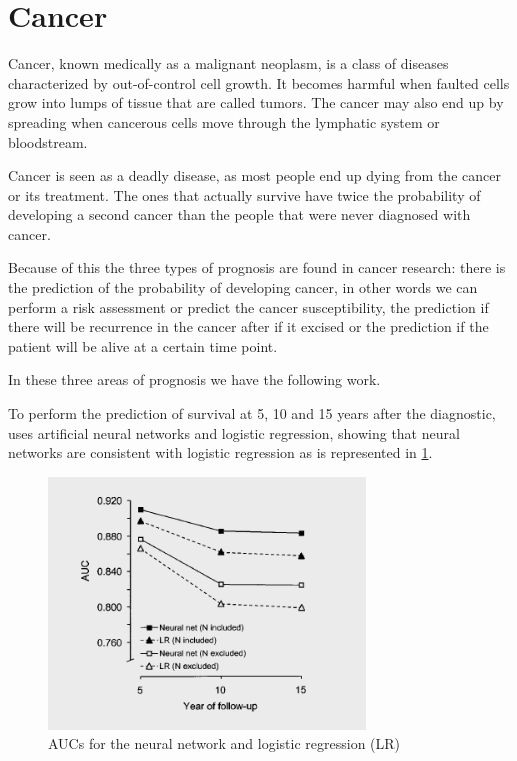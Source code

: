   \section{Cancer}
 \label{section:cancer}
 
Cancer, known medically as a malignant neoplasm, is a class of diseases characterized by out-of-control 
cell growth. It becomes harmful when faulted cells grow into lumps of tissue that are called tumors. The
 cancer may also end up by spreading when cancerous cells move through the lymphatic system or bloodstream.

Cancer is seen as a deadly disease, as most people end up dying from the cancer or its treatment. The ones 
that actually survive have twice the probability of developing a second cancer than the people that were never
 diagnosed with cancer. \cite{Rheingold2000}

Because of this the three types of prognosis are found in cancer research: there is the prediction of the
 probability of developing cancer, in other words we can perform a risk assessment or predict the cancer susceptibility,
 the prediction if there will be recurrence in the cancer after if it excised or the prediction if the patient will 
 be alive at a certain time point. 

In these three areas of prognosis we have the following work.

To perform the prediction of survival at 5, 10 and 15 years after the diagnostic, \cite{Lundin1999} uses artificial
 neural networks and logistic regression, showing that neural networks are consistent with logistic regression as is 
 represented in \ref{fig:LRvsNN}. 

 \begin{figure}[!htb]
  \centering
  \includegraphics[width=0.75\textwidth]{Figures/LRvsNN.png}
  \caption{AUCs for the neural network and logistic regression (LR)}
  \label{fig:LRvsNN}
\end{figure}

